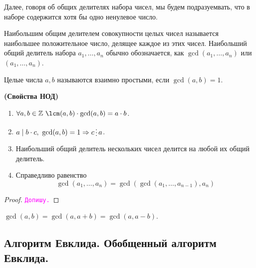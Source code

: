 \documentclass[11pt]{article}
\begin{document}
Далее, говоря об общих делителях набора чисел, мы будем подразуемвать, что в наборе содержится хотя бы одно ненулевое число.


\begin{definition}

	Наибольшим общим делителем совокупности целых чисел называется наибольшее положительное число, делящее каждое из этих чисел.
	Наибольший общий делитель набора $a_1, \ldots, a_n$ обычно обозначается, как $\gcd(a_1, \ldots, a_n)$ или $(a_1, \ldots, a_n)$.

\end{definition}

\begin{definition}
	Целые числа $a, b$ называются взаимно простыми, если $\gcd(a, b) = 1$.
\end{definition}

\begin{theorem} \textbf{(Свойства НОД)}
	\begin{enumerate}
	    \item $\forall a, b \in \mathbb{Z}\ \lcm(a, b) \cdot \gcd(a, b) = a \cdot b$.

		\item $a \mid b \cdot c, \ \gcd(a, b) = 1 \Rightarrow c \divisible a$.

		\item Наибольший общий делитель нескольких чисел делится на любой их общий делитель.

		\item Справедливо равенство
			  \[ \gcd(a_1, \ldots, a_n) = \gcd(\gcd(a_1, \ldots, a_{n - 1}), a_n)\]
	\end{enumerate}
\end{theorem}

\begin{proof}

    \textcolor{magenta}{\texttt{Допишу.}}

\end{proof}

\begin{statement}

	$\gcd(a, b) = \gcd(a, a + b) = \gcd(a, a - b)$.

\end{statement}

\subsection{Алгоритм Евклида. Обобщенный алгоритм Евклида.}
\end{document}

